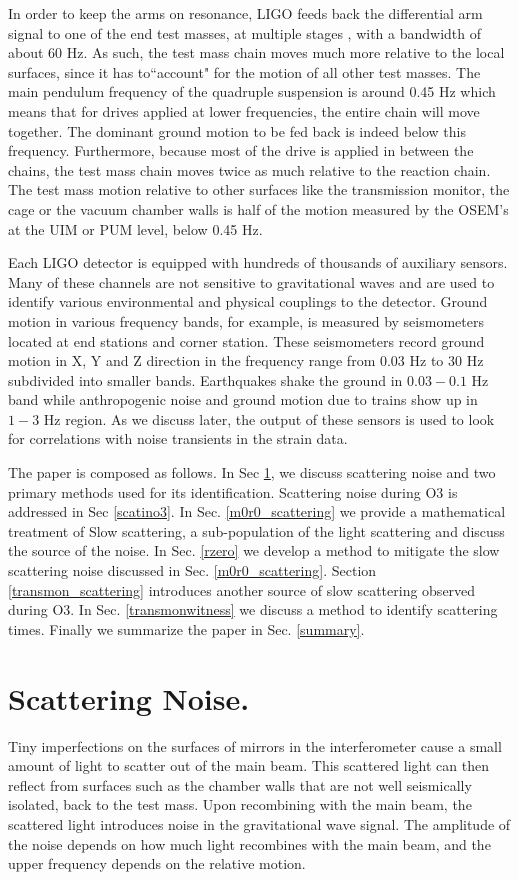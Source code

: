\documentclass[12pt]{iopart}
\begin{document}
In order to keep the arms on resonance, LIGO feeds back the differential arm signal to one of the end test masses, at multiple stages \cite{Martynov_2016}, with a bandwidth of about 60 Hz. As such, the test mass chain moves much more relative to the local surfaces, since it has to``account" for the motion of all other test masses. The main pendulum frequency of the quadruple suspension is around 0.45 Hz which means that for drives applied at lower frequencies, the entire chain will move together. The dominant ground motion to be fed back is indeed below this frequency. Furthermore, because most of the drive is applied in between the chains, the test mass chain moves twice as much relative to the reaction chain. The test mass motion relative to other surfaces like the transmission monitor, the cage or the vacuum chamber walls is half of the motion measured by the OSEM's at the UIM or PUM level, below 0.45 Hz.

Each LIGO detector is equipped with hundreds of thousands of auxiliary sensors. Many of these channels are not sensitive to gravitational waves and are used to identify various environmental and physical couplings to the detector.
Ground motion in various frequency bands, for example, is measured by seismometers located at end stations and corner station. These seismometers record ground motion in X, Y and Z direction in the frequency range from 0.03 Hz to 30 Hz subdivided into smaller bands. Earthquakes shake the ground in $0.03-0.1$ Hz band while anthropogenic noise and ground motion due to trains show up in $1-3$ Hz region. As we discuss later, the output of these sensors is used to look for correlations with noise transients in the strain data.

The paper is composed as follows. In Sec \ref{scatteringnoise}, we discuss scattering noise and two primary methods used for its identification. Scattering noise during O3 is addressed in Sec   \ref{scatino3}. In Sec. \ref{m0r0_scattering} we provide a mathematical treatment of Slow scattering, a sub-population of the light scattering and discuss the source of the noise. In Sec. \ref{rzero} we develop a method to mitigate the slow scattering noise discussed in Sec. \ref{m0r0_scattering}. Section \ref{transmon_scattering} introduces another source of slow scattering observed during O3. In Sec. \ref{transmonwitness} we discuss a method to identify scattering times. Finally we summarize the paper in Sec. \ref{summary}. 

 
\section{Scattering Noise.}\label{scatteringnoise}
Tiny imperfections on the surfaces of mirrors in the interferometer cause a small amount of light to scatter out of the main beam. This scattered light can then reflect from surfaces such as the chamber walls that are not well seismically isolated, back to the test mass. Upon recombining with the main beam, the scattered light introduces noise in the gravitational wave signal. The amplitude of the noise depends on how much light recombines with the main beam, and the upper frequency depends on the relative motion.
\end{document}
